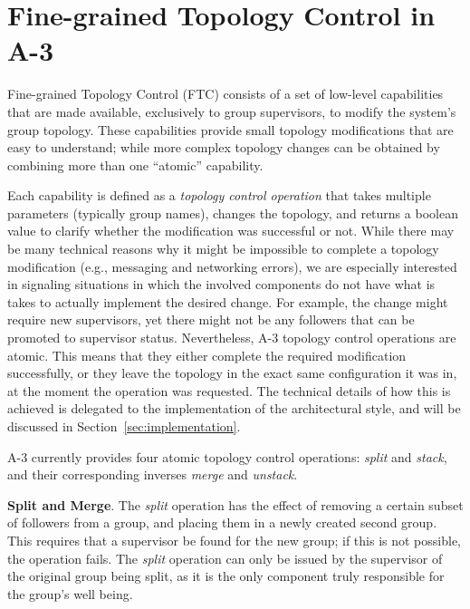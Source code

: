 
\section{Fine-grained Topology Control in A-3}
\label{sec:distributedControl}

Fine-grained Topology Control (FTC) consists of a set of low-level capabilities that are made available, exclusively to group supervisors, to modify the system's group topology. These capabilities provide small topology modifications that are easy to understand; while more complex topology changes can be obtained by combining more than one ``atomic'' capability.

Each capability is defined as a \emph{topology control operation} that takes multiple parameters (typically group names), changes the topology, and returns a boolean value to clarify whether the modification was successful or not. While there may be many technical reasons why it might be impossible to complete a topology modification (e.g., messaging and networking errors), we are especially interested in signaling situations in which the involved components do not have what is takes to actually implement the desired change. For example, the change might require new supervisors, yet there might not be any followers that can be promoted to supervisor status. Nevertheless, A-3 topology control operations are atomic. This means that they either complete the required modification successfully, or they leave the topology in the exact same configuration it was in, at the moment the operation was requested. The technical details of how this is achieved is delegated to the implementation of the architectural style, and will be discussed in Section~\ref{sec:implementation}.

A-3 currently provides four atomic topology control operations: \emph{split} and \emph{stack}, and their corresponding inverses \emph{merge} and \emph{unstack}. 


\textbf{Split and Merge}. The \emph{split} operation has the effect of removing a certain subset of followers from a group, and placing them in a newly created second group. This requires that a supervisor be found for the new group; if this is not possible, the operation fails. The \emph{split} operation can only be issued by the supervisor of the original group being split, as it is the only component truly responsible for the group's well being.

